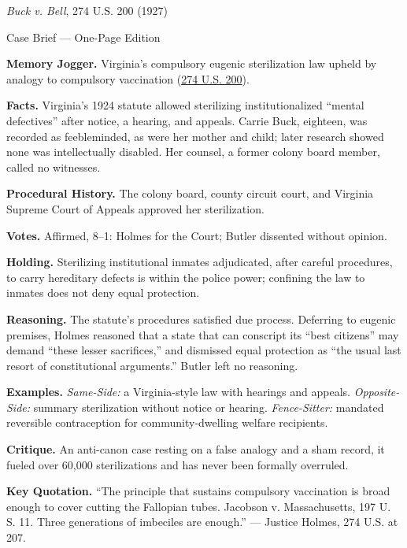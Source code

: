 \documentclass[12pt]{article}
\begin{document}
\begin{center}
{\Large \textit{Buck v. Bell}, 274 U.S. 200 (1927)\par}
\vspace{0.3em}
{\normalsize Case Brief --- One-Page Edition\par}
\end{center}

\textbf{Memory Jogger.} Virginia's compulsory eugenic sterilization law upheld by analogy to compulsory vaccination (\href{https://supreme.justia.com/cases/federal/us/274/200/}{274 U.S. 200}).

\textbf{Facts.} Virginia's 1924 statute allowed sterilizing institutionalized ``mental defectives'' after notice, a hearing, and appeals. Carrie Buck, eighteen, was recorded as feebleminded, as were her mother and child; later research showed none was intellectually disabled. Her counsel, a former colony board member, called no witnesses.

\textbf{Procedural History.} The colony board, county circuit court, and Virginia Supreme Court of Appeals approved her sterilization.

\textbf{Votes.} Affirmed, 8--1: Holmes for the Court; Butler dissented without opinion.

\textbf{Holding.} Sterilizing institutional inmates adjudicated, after careful procedures, to carry hereditary defects is within the police power; confining the law to inmates does not deny equal protection.

\textbf{Reasoning.} The statute's procedures satisfied due process. Deferring to eugenic premises, Holmes reasoned that a state that can conscript its ``best citizens'' may demand ``these lesser sacrifices,'' and dismissed equal protection as ``the usual last resort of constitutional arguments.'' Butler left no reasoning.

\textbf{Examples.} \emph{Same-Side:} a Virginia-style law with hearings and appeals. \emph{Opposite-Side:} summary sterilization without notice or hearing. \emph{Fence-Sitter:} mandated reversible contraception for community-dwelling welfare recipients.

\textbf{Critique.} An anti-canon case resting on a false analogy and a sham record, it fueled over 60,000 sterilizations and has never been formally overruled.

\textbf{Key Quotation.} ``The principle that sustains compulsory vaccination is broad enough to cover cutting the Fallopian tubes. Jacobson v. Massachusetts, 197 U. S. 11. Three generations of imbeciles are enough.'' --- Justice Holmes, 274 U.S. at 207.
\end{document}
